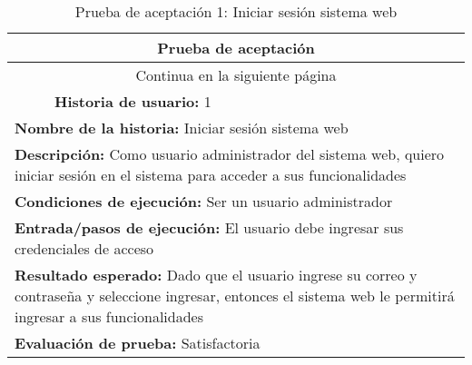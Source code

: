 \begin{longtable}{|p{6.7cm}|p{6.7cm}|}
    \caption{Prueba de aceptación 1: Iniciar sesión sistema web} \label{tab:prueba-1}
    \\
    \hline
    \multicolumn{2}{|c|}{\textbf{Prueba de aceptación}}                                                                                                                                                      \\
    \hline

    \endfirsthead

    \hline
    \endhead

    \hline
    \multicolumn{2}{|c|}{{Continua en la siguiente página}}                                                                                                                                                  \\
    \hline
    \endfoot

    \hline
    \endlastfoot
    \multicolumn{1}{|p{6.7cm}|}{\textbf{Número} 1 } & \multicolumn{1}{|p{6.7cm}|}{\textbf{Historia de usuario:} 1}                                                                                           \\
    \hline
    \multicolumn{2}{|p{13.4cm}|}{\textbf{Nombre de la historia:} Iniciar sesión sistema web }                                                                                                                \\
    \hline
    \multicolumn{2}{|p{13.4cm}|}{\textbf{Descripción:} Como usuario administrador del sistema web, quiero iniciar sesión en el sistema para acceder a sus funcionalidades}                                   \\
    \hline
    \multicolumn{2}{|p{13.4cm}|}{\textbf{Condiciones de ejecución:} Ser un usuario administrador}                                                                                                            \\
    \hline
    \multicolumn{2}{|p{13.4cm}|}{\textbf{Entrada/pasos de ejecución:} El usuario debe ingresar sus credenciales de acceso}                                                                                   \\
    \hline
    \multicolumn{2}{|p{13.4cm}|}{\textbf{Resultado esperado:} Dado que el usuario ingrese su correo y contraseña y seleccione ingresar, entonces el sistema web le permitirá ingresar a sus funcionalidades} \\
    \hline
    \multicolumn{2}{|p{13.4cm}|}{\textbf{Evaluación de prueba:} Satisfactoria}                                                                                                                               \\
    \hline
\end{longtable}


